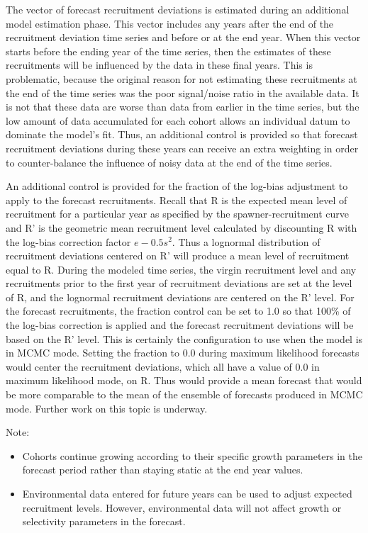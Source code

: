 The vector of forecast recruitment deviations is estimated during an additional model estimation phase.  This vector includes any years after the end of the recruitment deviation time series and before or at the end year. When this vector starts before the ending year of the time series, then the estimates of these recruitments will be influenced by the data in these final years. This is problematic, because the original reason for not estimating these recruitments at the end of the time series was the poor signal/noise ratio in the available data. It is not that these data are worse than data from earlier in the time series, but the low amount of data accumulated for each cohort allows an individual datum to dominate the model's fit. Thus, an additional control is provided so that forecast recruitment deviations during these years can receive an extra weighting in order to counter-balance the influence of noisy data at the end of the time series.

An additional control is provided for the fraction of the log-bias adjustment to apply to the forecast recruitments. Recall that R is the expected mean level of recruitment for a particular year as specified by the spawner-recruitment curve and R' is the geometric mean recruitment level calculated by discounting R with the log-bias correction factor $e-0.5s^2$. Thus a lognormal distribution of recruitment deviations centered on R' will produce a mean level of recruitment equal to R. During the modeled time series, the virgin recruitment level and any recruitments prior to the first year of recruitment deviations are set at the level of R, and the lognormal recruitment deviations are centered on the R' level.  For the forecast recruitments, the fraction control can be set to 1.0 so that 100\% of the log-bias correction is applied and the forecast recruitment deviations will be based on the R' level. This is certainly the configuration to use when the model is in MCMC mode. Setting the fraction to 0.0 during maximum likelihood forecasts would center the recruitment deviations, which all have a value of 0.0 in maximum likelihood mode, on R. Thus would provide a mean forecast that would be more comparable to the mean of the ensemble of forecasts produced in MCMC mode.  Further work on this topic is underway.

Note:
\begin{itemize}
	\item Cohorts continue growing according to their specific growth parameters in the forecast period rather than staying static at the end year values.
	\item Environmental data entered for future years can be used to adjust expected recruitment levels.  However, environmental data will not affect growth or selectivity parameters in the forecast.
\end{itemize}

